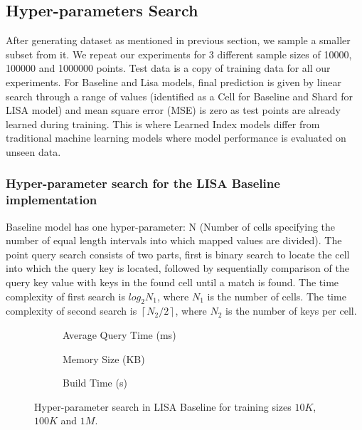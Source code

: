 \subsection{Hyper-parameters Search}
After generating dataset as mentioned in previous section, we sample a smaller subset from it. We repeat our experiments for 3 different sample sizes of 10000, 100000 and 1000000 points. Test data is a copy of training data for all our experiments. For Baseline and Lisa models, final prediction is given by linear search through a range of values (identified as a Cell for Baseline and Shard for LISA model) and mean square error (MSE) is zero as test points are already learned during training. This is where Learned Index models differ from traditional machine learning models where model performance is evaluated on unseen data. 

\subsubsection {Hyper-parameter search for the LISA Baseline implementation}
Baseline model has one hyper-parameter: N (Number of cells specifying the number of equal length intervals into which mapped values are divided). The point query search consists of two parts, first is binary search to locate the cell into which the query key is located, followed by sequentially comparison of the query key value with keys in the found cell until a match is found. The time complexity of first search is $log_{2}N_{1}$, where $N_{1}$ is the number of cells. The time complexity of second search is  $ \left \lceil {N_{2} / 2}\right \rceil $, where $N_{2}$ is the number of keys per cell.  

\begin{figure}
 \centering
     \begin{subfigure}[b]{0.32\textwidth}
         \centering
         
         \caption{Average Query Time (ms)}
         \label{fig:2d_exp3_1_1}
     \end{subfigure}
     \hfill
     \begin{subfigure}[b]{0.32\textwidth}
         \centering
         
         \caption{Memory Size (KB)}
         \label{fig:2d_exp3_1_2}
     \end{subfigure}
     \hfill
     \begin{subfigure}[b]{0.32\textwidth}
         \centering
         
         \caption{Build Time (s)}
         \label{fig:2d_exp3_1_3}
     \end{subfigure}
     \hfill
     \caption{Hyper-parameter search in LISA Baseline for training sizes $10K$, $100K$ and $1M$.}
     \label{fig:LISA_Baseline_Hyperparameter_Search}
\end{figure}



